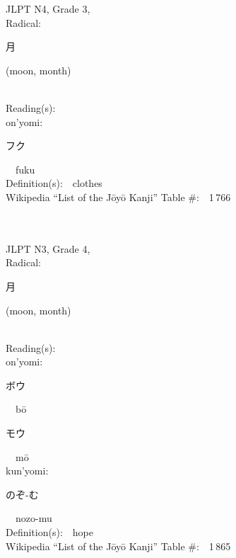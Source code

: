 \begin{multicols}{2}
{JLPT N4, Grade 3, \\Radical:\ \ {\begin{CJK}{UTF8}{min} 月 \end{CJK}} (moon, month) } \\
Reading(s):\ \ \\
{\hspace*{1em}}on'yomi:\ \ \\
{\hspace*{2em}}{\begin{CJK}{UTF8}{min} フク \end{CJK}}\ \ fuku\ \ \\
Definition(s):\ \ clothes \\
Wikipedia ``List of the J\=oy\=o Kanji'' Table \#:\ \ 1\,766 \\
\ \ \\
{\fontsize{34pt}{40pt}  }\ \ \\  %
{JLPT N3, Grade 4, \\Radical:\ \ {\begin{CJK}{UTF8}{min} 月 \end{CJK}} (moon, month) } \\
Reading(s):\ \ \\
{\hspace*{1em}}on'yomi:\ \ \\
{\hspace*{2em}}{\begin{CJK}{UTF8}{min} ボウ \end{CJK}}\ \ b\=o\ \ \\
{\hspace*{2em}}{\begin{CJK}{UTF8}{min} モウ \end{CJK}}\ \ m\=o\ \ \\
{\hspace*{1em}}kun'yomi:\ \ \\
{\hspace*{2em}}{\begin{CJK}{UTF8}{min} のぞ-む \end{CJK}}\ \ nozo-mu\ \ \\
Definition(s):\ \ hope \\
Wikipedia ``List of the J\=oy\=o Kanji'' Table \#:\ \ 1\,865 \\
\ \ \\
{\fontsize{34pt}{40pt}  }\ \ \\  %

\end{multicols}
